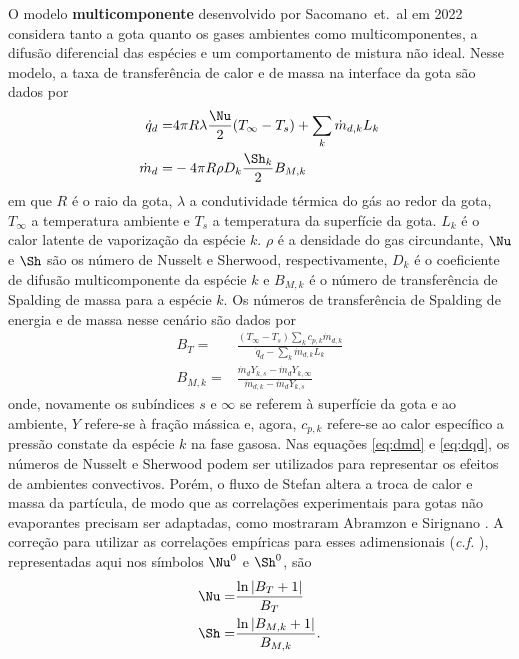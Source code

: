 O modelo \textbf{multicomponente} desenvolvido por Sacomano~et.~al em 2022 \cite{SacomanoF2022IJHMT} considera tanto a gota quanto os gases ambientes como multicomponentes, a difusão diferencial das espécies e um comportamento de mistura não ideal.
Nesse modelo, a taxa de transferência de calor e de massa na interface da gota são dados por 
\begin{align}
    \dot q_d =& 4\pi R \lambda \frac{\Nu}{2}(T_\infty - T_s) + \sum_k \dot m_{d,k} L_k \label{eq:dmd} \\
    \dot m_d =& -4 \pi R \rho D_k \frac{\Sh_k}{2}B_{M,k} \label{eq:dqd}
\end{align}
em que $R$ é o raio da gota, $\lambda$ a condutividade térmica do gás ao redor da gota, $T_\infty$ a temperatura ambiente e $T_s$ a temperatura da superfície da gota. 
$L_k$ é o calor latente de vaporização da espécie $k$.
$\rho$ é a densidade do gas circundante, $\Nu$ e $\Sh$ são os número de Nusselt e Sherwood, respectivamente, $D_k$ é o coeficiente de difusão multicomponente da espécie $k$ e $B_{M,k}$ é o número de transferência de Spalding de massa para a espécie $k$.
Os números de transferência de Spalding de energia e de massa nesse cenário são dados por
\begin{align}
    B_T =& \frac
        {(T_\infty - T_s) \sum_k c_{p,k}\dot m_{d,k}}
        {\dot q_d - \sum_k \dot m_{d,k} L_k} \label{eq:B_T}\\
    B_{M,k} =& \frac
        {\dot m_d Y_{k,s} - \dot m_d Y_{k,\infty}}
        {\dot m_{d,k} - \dot m_d Y_{k,s}}\label{eq:B_Mk}
\end{align}
onde, novamente os subíndices $s$ e $\infty$ se referem à superfície da gota e ao ambiente, $Y$ refere-se à fração mássica e, agora, $c_{p,k}$ refere-se ao calor específico a pressão constate da espécie $k$ na fase gasosa.
Nas equações \eqref{eq:dmd} e \eqref{eq:dqd}, os números de Nusselt e Sherwood podem ser utilizados para representar os efeitos de ambientes convectivos.
Porém, o fluxo de Stefan altera a troca de calor e massa da partícula, de modo que as correlações experimentais para gotas não evaporantes precisam ser adaptadas, como mostraram Abramzon e Sirignano \cite{Sirignano1989}.
A correção para utilizar as correlações empíricas para esses adimensionais  (\emph{c.f.} \cite[eqs. (8) e (9)]{SacomanoF2025CF}), representadas aqui nos símbolos $\Nu^0$ e $\Sh^0$, são
\begin{align}
    \Nu =& \frac{\ln \left|B_T + 1\right|}{B_T} \\
    \Sh =& \frac{\ln \left|B_{M,k} + 1\right|}{B_{M,k}}.
\end{align}

